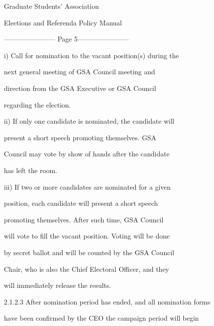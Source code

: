                                 Graduate Students’ Association  

                           Elections and Referenda Policy Manual  

  


----------------------- Page 5-----------------------

  

                  i)       Call for nomination to the vacant  position(s)  during  the  

                           next   general   meeting   of   GSA   Council   meeting   and  

                           direction   from   the  GSA   Executive   or  GSA   Council  

                           regarding the election.  

  

                  ii)      If  only  one  candidate  is  nominated,  the  candidate  will  

                           present   a   short   speech   promoting   themselves.   GSA  

                           Council  may vote by show of hands after  the  candidate  

                           has left the room.   

  

                  iii)     If  two  or  more  candidates  are  nominated  for  a  given  

                           position,  each  candidate  will  present  a  short  speech  

                           promoting  themselves.  After  such  time,  GSA  Council  

                           will vote to fill the vacant position. Voting will be done  

                           by secret ballot and will be counted by the GSA Council  

                           Chair, who is also the Chief Electoral Officer, and they  

                           will immediately release the results.   

  

2.1.2.3        After  nomination  period  has  ended,  and  all  nomination  forms  

               have been confirmed by the CEO the campaign period will begin  

